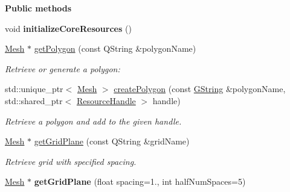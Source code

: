 \begin{Indent}\textbf{ Public methods}\par
\begin{DoxyCompactItemize}
\item 
\mbox{\label{classrev_1_1_polygon_cache_ace78aaa36c6e0db24594f6b3f4e12c14}} 
void {\bfseries initialize\+Core\+Resources} ()
\item 
\mbox{\label{classrev_1_1_polygon_cache_a9149bcb610f9f15b282d9785e8ac833a}} 
\mbox{\hyperlink{classrev_1_1_mesh}{Mesh}} $\ast$ \mbox{\hyperlink{classrev_1_1_polygon_cache_a9149bcb610f9f15b282d9785e8ac833a}{get\+Polygon}} (const Q\+String \&polygon\+Name)
\begin{DoxyCompactList}\small\item\em Retrieve or generate a polygon\+: \end{DoxyCompactList}\item 
\mbox{\label{classrev_1_1_polygon_cache_a12143cd624de6a5f148e9b294045b00b}} 
std\+::unique\+\_\+ptr$<$ \mbox{\hyperlink{classrev_1_1_mesh}{Mesh}} $>$ \mbox{\hyperlink{classrev_1_1_polygon_cache_a12143cd624de6a5f148e9b294045b00b}{create\+Polygon}} (const \mbox{\hyperlink{classrev_1_1_g_string}{G\+String}} \&polygon\+Name, std\+::shared\+\_\+ptr$<$ \mbox{\hyperlink{classrev_1_1_resource_handle}{Resource\+Handle}} $>$ handle)
\begin{DoxyCompactList}\small\item\em Retrieve a polygon and add to the given handle. \end{DoxyCompactList}\item 
\mbox{\label{classrev_1_1_polygon_cache_aa8f0835ff7c99802592ab728facfc32a}} 
\mbox{\hyperlink{classrev_1_1_mesh}{Mesh}} $\ast$ \mbox{\hyperlink{classrev_1_1_polygon_cache_aa8f0835ff7c99802592ab728facfc32a}{get\+Grid\+Plane}} (const Q\+String \&grid\+Name)
\begin{DoxyCompactList}\small\item\em Retrieve grid with specified spacing. \end{DoxyCompactList}\item 
\mbox{\label{classrev_1_1_polygon_cache_a6848021be54d804e6ade62516e5063f9}} 
\mbox{\hyperlink{classrev_1_1_mesh}{Mesh}} $\ast$ {\bfseries get\+Grid\+Plane} (float spacing=1., int half\+Num\+Spaces=5)

\end{DoxyCompactItemize}
\end{Indent}
